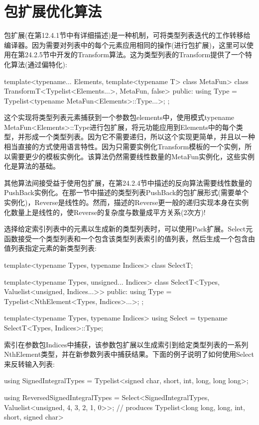 \section{包扩展优化算法}
包扩展(在第12.4.1节中有详细描述)是一种机制，可将类型列表迭代的工作转移给编译器。因为需要对列表中的每个元素应用相同的操作(进行包扩展)，这里可以使用在第24.2.5节中开发的Transform算法。这为类型列表的Transform提供了一个特化算法(通过偏特化):

\begin{cpp}
template<typename... Elements, template<typename T> class MetaFun>
class TransformT<Typelist<Elements...>, MetaFun, false>
{
	public:
	using Type = Typelist<typename MetaFun<Elements>::Type...>;
};
\end{cpp}

这个实现将类型列表元素捕获到一个参数包elements中，使用模式typename MetaFun<Elements>::Type进行包扩展，将元功能应用到Elements中的每个类型，并形成一个类型列表。因为它不需要递归，所以这个实现更简单，并且以一种相当直接的方式使用语言特性。因为只需要实例化Transform模板的一个实例，所以需要更少的模板实例化。该算法仍然需要线性数量的MetaFun实例化，这些实例化是算法的基础。

其他算法间接受益于使用包扩展，在第24.2.4节中描述的反向算法需要线性数量的PushBack实例化。在那一节中描述的类型列表PushBack的包扩展形式(需要单个实例化)，Reverse是线性的。然而，描述的Reverse更一般的递归实现本身在实例化数量上是线性的，使Reverse的复杂度与数量成平方关系(2次方)!

选择给定索引列表中的元素以生成新的类型列表时，可以使用Pack扩展。Select元函数接受一个类型列表和一个包含该类型列表索引的值列表，然后生成一个包含由值列表指定元素的新类型列表:

\begin{cpp}
template<typename Types, typename Indices>
class SelectT;

template<typename Types, unsigned... Indices>
class SelectT<Types, Valuelist<unsigned, Indices...>>
{
	public:
	using Type = Typelist<NthElement<Types, Indices>...>;
};

template<typename Types, typename Indices>
using Select = typename SelectT<Types, Indices>::Type;
\end{cpp}

索引在参数包Indices中捕获，该参数包扩展以生成索引到给定类型列表的一系列NthElement类型，并在新参数列表中捕获结果。下面的例子说明了如何使用Select来反转输入列表:

\begin{cpp}
using SignedIntegralTypes =
	Typelist<signed char, short, int, long, long long>;

using ReversedSignedIntegralTypes =
	Select<SignedIntegralTypes, Valuelist<unsigned, 4, 3, 2, 1, 0>>;
	// produces Typelist<long long, long, int, short, signed char>
\end{cpp}

